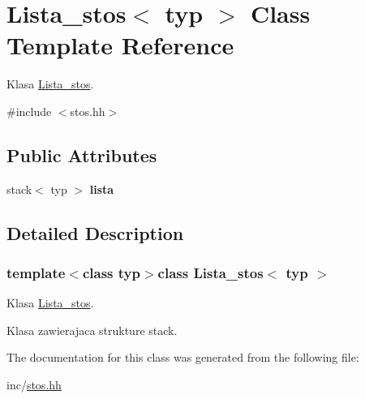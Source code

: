 \hypertarget{class_lista__stos}{\section{Lista\-\_\-stos$<$ typ $>$ Class Template Reference}
\label{class_lista__stos}
}


Klasa \hyperlink{class_lista__stos}{Lista\-\_\-stos}.  




{\ttfamily \#include $<$stos.\-hh$>$}

\subsection*{Public Attributes}
\begin{DoxyCompactItemize}
\item 
\hypertarget{class_lista__stos_ab507c0b086322a44e7b047454694954f}{stack$<$ typ $>$ {\bfseries lista}}\label{class_lista__stos_ab507c0b086322a44e7b047454694954f}

\end{DoxyCompactItemize}


\subsection{Detailed Description}
\subsubsection*{template$<$class typ$>$class Lista\-\_\-stos$<$ typ $>$}

Klasa \hyperlink{class_lista__stos}{Lista\-\_\-stos}. 

Klasa zawierajaca strukture stack. 

The documentation for this class was generated from the following file\-:\begin{DoxyCompactItemize}
\item 
inc/\hyperlink{stos_8hh}{stos.\-hh}\end{DoxyCompactItemize}
